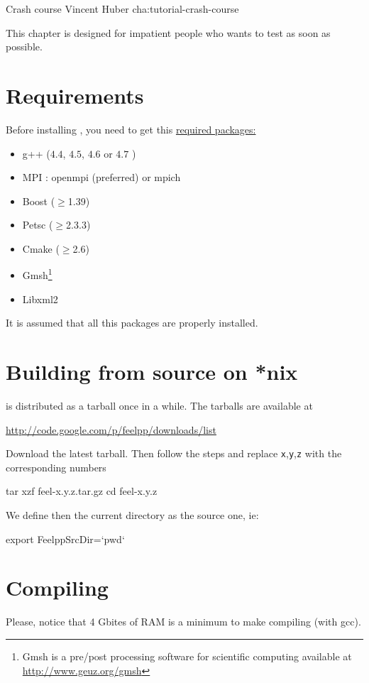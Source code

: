             {Crash course}
            {Vincent Huber}
            {cha:tutorial-crash-course}

This chapter is designed for impatient people who wants to test \feel as soon as possible.
\section{Requirements}
Before installing \feel, you need to get this \underline{required packages:}\\
\begin{itemize}
\item g++ ($4.4$, $4.5$, $4.6$ or $4.7$  )
\item MPI : openmpi (preferred) or mpich
\item Boost ($\geq$1.39)
\item Petsc ($\geq$2.3.3)
\item Cmake ($\geq$2.6)
\item Gmsh\footnote{Gmsh is a pre/post processing software for scientific
computing available at \url{http://www.geuz.org/gmsh}}
\item Libxml2
\end{itemize}
It is assumed that all this packages are properly installed.

\section{Building \feel from source on *nix}
\feel is distributed as a tarball once in a while. The tarballs are available
at
\begin{center}
  \href{http://code.google.com/p/feelpp/downloads/list}{http://code.google.com/p/feelpp/downloads/list}
\end{center}
Download the latest tarball. Then follow the steps and replace
\texttt{x},\texttt{y},\texttt{z} with the corresponding numbers

\begin{unixcom}
  tar xzf feel-x.y.z.tar.gz
  cd feel-x.y.z
\end{unixcom}
We define then the current directory as the source one, ie:
\begin{unixcom}
  export FeelppSrcDir=`pwd`
\end{unixcom}

\section{Compiling}
Please, notice that 4 Gbites of RAM is a minimum to make \feel compiling (with gcc).

